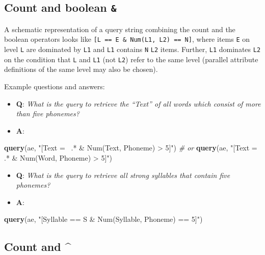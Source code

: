 \documentclass[]{book}
\newenvironment{Shaded}{\begin{snugshade}}{\end{snugshade}}
\newcommand{\CommentTok}[1]{\textcolor[rgb]{0.56,0.35,0.01}{\textit{#1}}}
\newcommand{\KeywordTok}[1]{\textcolor[rgb]{0.13,0.29,0.53}{\textbf{#1}}}
\newcommand{\NormalTok}[1]{#1}
\newcommand{\StringTok}[1]{\textcolor[rgb]{0.31,0.60,0.02}{#1}}
\providecommand{\tightlist}{%
  \setlength{\itemsep}{0pt}\setlength{\parskip}{0pt}}
\begin{document}
\hypertarget{count-and-boolean}{%
\subsection{\texorpdfstring{Count and boolean \texttt{\&}}{Count and boolean \&}}\label{count-and-boolean}}

A schematic representation of a query string combining the count and the boolean operators looks like \texttt{{[}L\ ==\ E\ \&\ Num(L1,\ L2)\ ==\ N{]}}, where items \texttt{E} on level \texttt{L} are dominated by \texttt{L1} and \texttt{L1} contains \texttt{N} \texttt{L2} items. Further, \texttt{L1} dominates \texttt{L2} on the condition that \texttt{L} and \texttt{L1} (not \texttt{L2}) refer to the same level (parallel attribute definitions of the same level may also be chosen).

Example questions and answers:

\begin{itemize}
\tightlist
\item
  \textbf{Q}: \emph{What is the query to retrieve the ``Text'' of all words which consist of more than five phonemes?}
\item
  \textbf{A}:
\end{itemize}

\begin{Shaded}
\begin{Highlighting}[]
\KeywordTok{query}\NormalTok{(ae, }\StringTok{"[Text =~ .* & Num(Text, Phoneme) > 5]"}\NormalTok{) }
\CommentTok{# or }
\KeywordTok{query}\NormalTok{(ae, }\StringTok{"[Text =~ .* & Num(Word, Phoneme) > 5]"}\NormalTok{)}
\end{Highlighting}
\end{Shaded}

\begin{itemize}
\tightlist
\item
  \textbf{Q}: \emph{What is the query to retrieve all strong syllables that contain five phonemes?}
\item
  \textbf{A}:
\end{itemize}

\begin{Shaded}
\begin{Highlighting}[]
\KeywordTok{query}\NormalTok{(ae, }\StringTok{"[Syllable == S & Num(Syllable, Phoneme) == 5]"}\NormalTok{)}
\end{Highlighting}
\end{Shaded}

\hypertarget{count-and}{%
\subsection{Count and \^{}}\label{count-and}}
\end{document}
